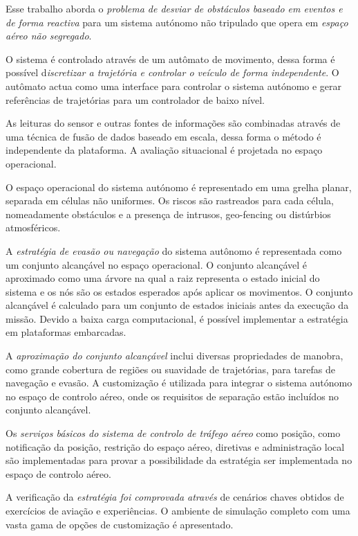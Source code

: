 \setcounter{chapter}{8}
\setcounter{section}{3}
\setcounter{subsection}{0}
\noindent Esse trabalho aborda o \textit{problema de desviar de obstáculos baseado em eventos e de forma reactiva} para um sistema autónomo não tripulado que opera em \textit{espaço aéreo não segregado}.

O sistema é controlado através de um autômato de movimento, dessa forma é possível d\textit{iscretizar a trajetória e controlar o veículo de forma independente}. O autômato actua como uma interface  para controlar o sistema autónomo e gerar referências de trajetórias para um controlador de baixo nível.

As leituras do sensor e outras fontes de informações são combinadas através de uma técnica de fusão de dados baseado em escala, dessa forma o método é independente da plataforma. A avaliação situacional é projetada no espaço operacional.


O espaço operacional do sistema autónomo é representado em uma grelha planar, separada em células não uniformes. Os riscos são rastreados para cada célula, nomeadamente obstáculos e a presença de intrusos, geo-fencing ou distúrbios atmosféricos.


A\textit{ estratégia de evasão ou navegação} do sistema autônomo é representada como um conjunto alcançável no espaço operacional. O conjunto alcançável é aproximado como uma árvore na qual a raiz representa o estado inicial do sistema e os nós são os estados esperados após aplicar os movimentos. O conjunto alcançável é calculado para um conjunto de estados iniciais antes da execução da missão. Devido a baixa carga computacional, é possível implementar a estratégia em plataformas embarcadas.

A \textit{aproximação do conjunto alcançável} inclui diversas propriedades de manobra, como grande cobertura de regiões ou suavidade de trajetórias, para tarefas de navegação e evasão. A customização é utilizada para integrar o sistema autónomo no espaço de controlo aéreo, onde os requisitos de separação estão incluídos no conjunto alcançável.

Os \textit{serviços básicos do sistema de controlo de tráfego aéreo} como posição, como notificação da posição, restrição do espaço aéreo, diretivas e administração local são implementadas para provar a possibilidade da estratégia ser implementada no espaço de controlo aéreo.


A verificação da \textit{estratégia foi comprovada através} de cenários chaves obtidos de exercícios de  aviação e experiências. O ambiente de simulação completo com uma vasta gama de opções de customização é apresentado.
